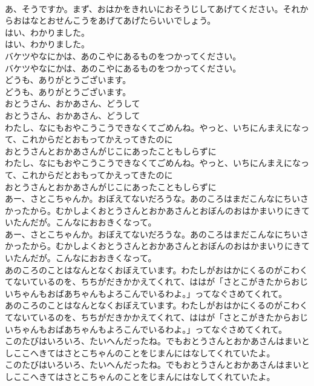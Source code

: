 \documentclass[8pt]{extreport}
\begin{document}
\begin{CJK}{UTF8}{min}
\\	あ、そうですか。まず、おはかをきれいにおそうじしてあげてください。それからおはなとおせんこうをあげてあげたらいいでしょう。
\\	はい、わかりました。
\\	はい、わかりました。
\\	バケツやなにかは、あのこやにあるものをつかってください。
\\	バケツやなにかは、あのこやにあるものをつかってください。
\\	どうも、ありがとうございます。
\\	どうも、ありがとうございます。
\\	おとうさん、おかあさん、どうして
\\	おとうさん、おかあさん、どうして
\\	わたし、なにもおやこうこうできなくてごめんね。やっと、いちにんまえになって、これからだとおもってかえってきたのに
\\	おとうさんとおかあさんがじこにあったこともしらずに
\\	わたし、なにもおやこうこうできなくてごめんね。やっと、いちにんまえになって、これからだとおもってかえってきたのに
\\	おとうさんとおかあさんがじこにあったこともしらずに
\\	あー、さとこちゃんか。おぼえてないだろうな。あのころはまだこんなにちいさかったから。むかしよくおとうさんとおかあさんとおぼんのおはかまいりにきていたんだが。こんなにおおきくなって。
\\	あー、さとこちゃんか。おぼえてないだろうな。あのころはまだこんなにちいさかったから。むかしよくおとうさんとおかあさんとおぼんのおはかまいりにきていたんだが。こんなにおおきくなって。
\\	あのころのことはなんとなくおぼえています。わたしがおはかにくるのがこわくてないているのを、ちちがだきかかえてくれて、ははが「さとこがきたからおじいちゃんもおばあちゃんもよろこんでいるわよ。」ってなぐさめてくれて。
\\	あのころのことはなんとなくおぼえています。わたしがおはかにくるのがこわくてないているのを、ちちがだきかかえてくれて、ははが「さとこがきたからおじいちゃんもおばあちゃんもよろこんでいるわよ。」ってなぐさめてくれて。
\\	このたびはいろいろ、たいへんだったね。でもおとうさんとおかあさんはまいとしここへきてはさとこちゃんのことをじまんにはなしてくれていたよ。
\\	このたびはいろいろ、たいへんだったね。でもおとうさんとおかあさんはまいとしここへきてはさとこちゃんのことをじまんにはなしてくれていたよ。

\end{CJK}
\end{document}
